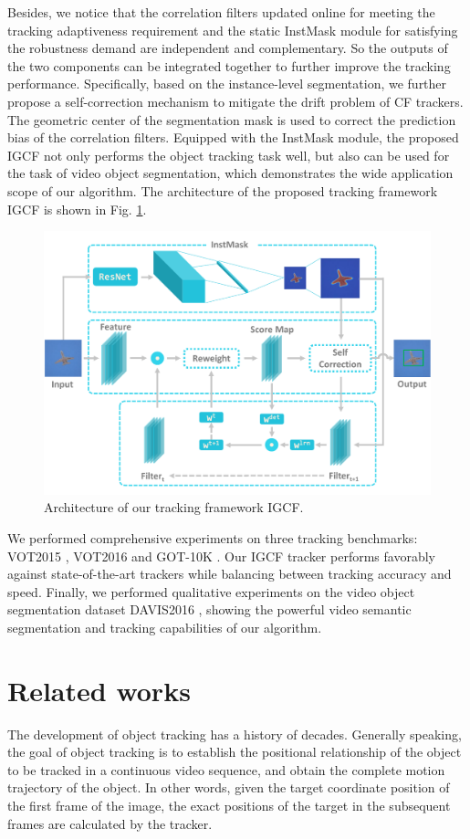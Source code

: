 \documentclass[review]{elsarticle}
\begin{document}
\begin{CJK*}{UTF8}{gbsn}
Besides, we notice that the correlation filters updated online for meeting the tracking adaptiveness requirement and the static InstMask module for satisfying the robustness demand are independent and complementary. So the outputs of the two components can be integrated together to further improve the tracking performance. Specifically, based on the instance-level segmentation, we further propose a self-correction mechanism to mitigate the drift problem of CF trackers. The geometric center of the segmentation mask is used to correct the prediction bias of the correlation filters. Equipped with the InstMask module, the proposed IGCF not only performs the object tracking task well, but also can be used for the task of video object segmentation, which demonstrates the wide application scope of our algorithm. The architecture of the proposed tracking framework IGCF is shown in Fig. \ref{fig:IGCF}.

\begin{figure}
    \centering
    \includegraphics[width=12cm]{images/instmask1.pdf}
    \caption{Architecture of our tracking framework IGCF.}
    \label{fig:IGCF}
\end{figure}

We performed comprehensive experiments on three tracking benchmarks: VOT2015 \cite{Kristan2015TheVO}, VOT2016 \cite{Kristan2016TheVO} and GOT-10K \cite{Huang2018GOT10kAL}. Our IGCF tracker performs favorably against state-of-the-art trackers while balancing between tracking accuracy and speed. Finally, we performed qualitative experiments on the video object segmentation dataset DAVIS2016 \cite{Perazzi2016}, showing the powerful video semantic segmentation and tracking capabilities of our algorithm.

\section{Related works}
The development of object tracking has a history of decades. Generally speaking, the goal of object tracking is to establish the positional relationship of the object to be tracked in a continuous video sequence, and obtain the complete motion trajectory of the object. In other words, given the target coordinate position of the first frame of the image, the exact positions of the target in the subsequent frames are calculated by the tracker. 


\end{CJK*}
\end{document}
